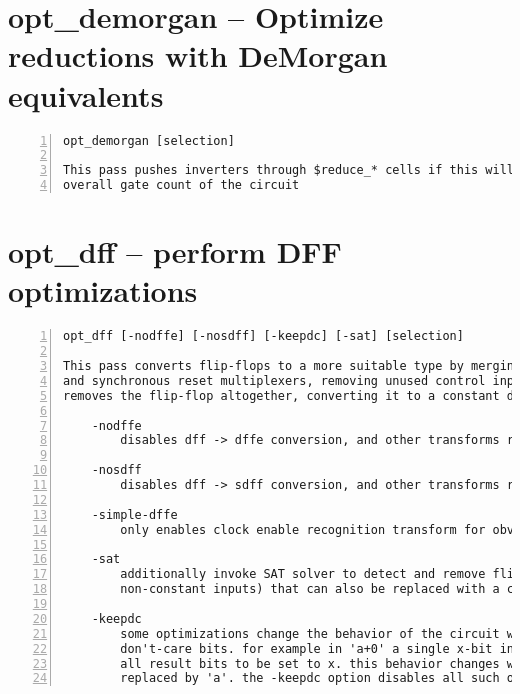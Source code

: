 \section{opt\_demorgan -- Optimize reductions with DeMorgan equivalents}
\label{cmd:opt_demorgan}
\begin{lstlisting}[numbers=left,frame=single]
    opt_demorgan [selection]

This pass pushes inverters through $reduce_* cells if this will reduce the
overall gate count of the circuit
\end{lstlisting}

\section{opt\_dff -- perform DFF optimizations}
\label{cmd:opt_dff}
\begin{lstlisting}[numbers=left,frame=single]
    opt_dff [-nodffe] [-nosdff] [-keepdc] [-sat] [selection]

This pass converts flip-flops to a more suitable type by merging clock enables
and synchronous reset multiplexers, removing unused control inputs, or potentially
removes the flip-flop altogether, converting it to a constant driver.

    -nodffe
        disables dff -> dffe conversion, and other transforms recognizing clock enable

    -nosdff
        disables dff -> sdff conversion, and other transforms recognizing sync resets

    -simple-dffe
        only enables clock enable recognition transform for obvious cases

    -sat
        additionally invoke SAT solver to detect and remove flip-flops (with
        non-constant inputs) that can also be replaced with a constant driver

    -keepdc
        some optimizations change the behavior of the circuit with respect to
        don't-care bits. for example in 'a+0' a single x-bit in 'a' will cause
        all result bits to be set to x. this behavior changes when 'a+0' is
        replaced by 'a'. the -keepdc option disables all such optimizations.
\end{lstlisting}

